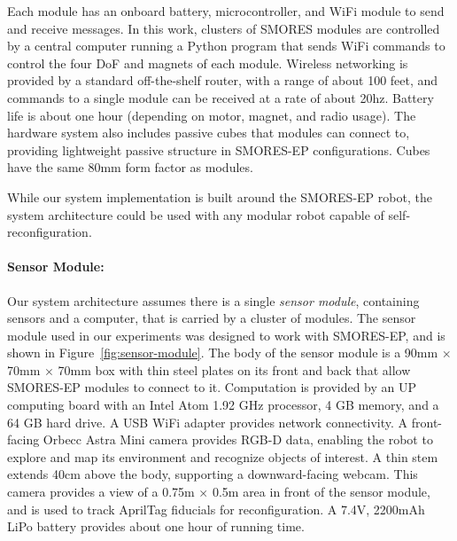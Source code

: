 \documentclass[12pt]{article}
\begin{document}
Each module has an onboard battery, microcontroller, and WiFi
module to send and receive messages.  In this work, clusters of SMORES
modules are controlled by a central computer running a Python program that
sends WiFi commands to control the four DoF and magnets of each module.
Wireless networking is provided by a standard off-the-shelf  router, with a range of about 100 feet, and commands to a single module can be received at a rate of about 20hz.
Battery life is about one hour (depending on motor, magnet, and radio usage).
The hardware system also includes passive cubes that modules can connect to, providing lightweight passive structure in SMORES-EP configurations.  Cubes have the same 80mm form factor as modules.

While our system implementation is built around the SMORES-EP robot, the system architecture could be used with any modular robot capable of self-reconfiguration. 

%

%
\paragraph{Sensor Module:} %
\label{sec:sensor_module}
%
Our system architecture assumes there is a single \textit{sensor module}, containing sensors and a computer, that is carried by a cluster of modules.
The sensor module used in our experiments was designed to work with SMORES-EP, and is shown in Figure~\ref{fig:sensor-module}.
The body of the sensor module is a 90mm $\times$ 70mm $\times$ 70mm box with thin steel plates on its front and back that allow SMORES-EP modules
to connect to it.
Computation is provided by an UP computing board with an Intel Atom 1.92 GHz
processor, 4 GB memory, and a 64 GB hard drive. A USB WiFi adapter provides
network connectivity. A front-facing Orbecc Astra Mini camera provides RGB-D
data, enabling the robot to explore and map its environment and recognize
objects of interest.  A thin stem extends 40cm above the body, supporting a
downward-facing webcam. This camera provides a view of a  0.75m $\times$ 0.5m area
in front of the sensor module, and is used to track AprilTag
\cite{olson2011apriltag} fiducials for reconfiguration. A 7.4V, 2200mAh LiPo
battery provides about one hour of running time.
%
\end{document}
